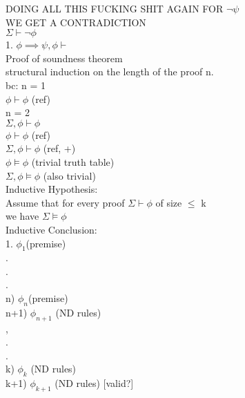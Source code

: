 \documentclass[12pt,oneside,fleqn]{article}
\theoremstyle{definition}
\begin{document}
DOING ALL THIS FUCKING SHIT AGAIN FOR $\neg \psi$ \\
WE GET A CONTRADICTION \\

$\Sigma \vdash \neg \phi$ \\


1. $\phi \implies \psi, \phi \vdash$  \\
 
 
Proof of soundness theorem \\
structural induction on the length of the proof n. \\
bc: n = 1 \\
$\phi \vdash \phi$ (ref) \\
n = 2 \\
$\Sigma, \phi \vdash \phi$ \\
$\phi \vdash \phi$ (ref) \\
$\Sigma, \phi \vdash \phi$ (ref, +) \\
 
$\phi \vDash \phi$ (trivial truth table) \\
$\Sigma, \phi \vDash \phi$ (also trivial) \\

Inductive Hypothesis: \\
Assume that for every proof $\Sigma \vdash \phi$ of size $\leq$ k \\
we have $\Sigma \vDash \phi$ \\
 
Inductive Conclusion: \\
1. $\phi_1 $(premise) \\
. \\
. \\
. \\
n) $\phi_n $(premise) \\
n+1) $\phi_{n+1}$ (ND rules) \\
, \\
. \\
. \\
k) $\phi_k$ (ND rules) \\
k+1) $\phi_{k+1}$ (ND rules) [valid?] \\
\end{document}
